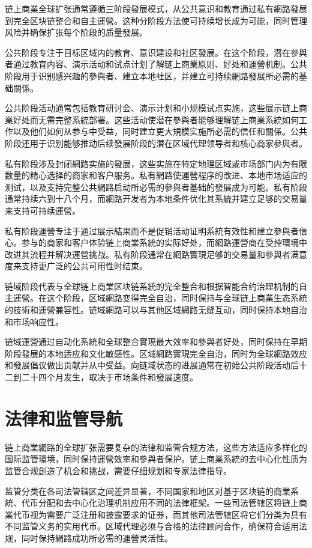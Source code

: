 \documentclass[
  Letterpaper,
]{scrbook}
\begin{document}
链上商業全球扩张通常遵循三阶段發展模式，从公共意识和教育通过私有網路發展到完全区块链整合和自主運營。这种分阶段方法使可持续增长成为可能，同时管理风险并确保扩张每个阶段的质量發展。

公共阶段专注于目标区域内的教育、意识建设和社区發展。在这个阶段，潜在參與者通过教育内容、演示活动和试点计划了解链上商業原则、好处和運營机制。公共阶段用于识别感兴趣的參與者、建立本地社区，并建立可持续網路發展所必需的基础關係。

公共阶段活动通常包括教育研讨会、演示计划和小規模试点实施，这些展示链上商業好处而无需完整系統部署。这些活动使潜在參與者能够理解链上商業系統如何工作以及他们如何从参与中受益，同时建立更大規模实施所必需的信任和關係。公共阶段还用于识别能够推动后续發展阶段的潜在区域代理领导者和核心商家參與者。

私有阶段涉及封闭網路实施的發展，这些实施在特定地理区域或市场部门内为有限数量的精心选择的商家和客户服务。私有網路使運營程序的改进、本地市场适应的测试，以及支持完整公共網路启动所必需的參與者基础的發展成为可能。私有阶段通常持续六到十八个月，而網路开发者为本地条件优化其系統并建立足够的交易量来支持可持续運營。

私有阶段運營专注于通过展示結果而不是促销活动证明系統有效性和建立參與者信心。参与的商家和客户体验链上商業系統的实际好处，而網路運營商在受控環境中改进其流程并解决運營挑战。私有阶段通常在網路實現足够的交易量和參與者满意度来支持更广泛的公共可用性时结束。

链域阶段代表与全球链上商業区块链系統的完全整合和根据智能合约治理机制的自主運營。在这个阶段，区域網路变得完全自治，同时保持与全球链上商業生态系統的技術和運營兼容性。链域網路可以与其他区域網路无缝互动，同时保持本地自治和市场响应性。

链域運營通过自动化系統和全球整合實現最大效率和參與者好处，同时保持在早期阶段發展的本地适应和文化敏感性。区域網路實現完全自治，同时为全球網路效应和發展倡议做出贡献并从中受益。向链域状态的进展通常在初始公共阶段活动后十二到二十四个月发生，取决于市场条件和發展速度。

\section{法律和监管导航}\label{ux6cd5ux5f8bux548cux76d1ux7ba1ux5bfcux822a}

链上商業網路的全球扩张需要复杂的法律和监管合规方法，这些方法适应多样化的国际监管環境，同时保持運營效率和參與者保护。链上商業系統的去中心化性质为监管合规創造了机会和挑战，需要仔细规划和专家法律指导。

监管分类在各司法管辖区之间差异显著，不同国家和地区对基于区块链的商業系統、代币分配和去中心化治理机制应用不同的法律框架。一些司法管辖区将链上商業代币视为需要广泛注册和披露要求的证券，而其他司法管辖区将它们分类为具有不同监管义务的实用代币。区域代理必须与合格的法律顾问合作，确保符合适用法规，同时保持網路成功所必需的運營灵活性。
\end{document}
